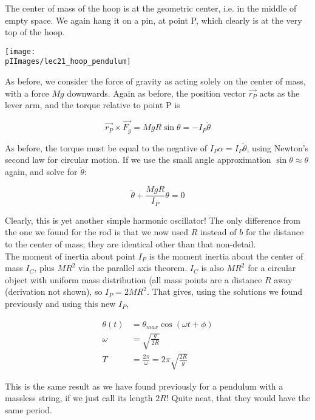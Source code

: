 The center of mass of the hoop is at the geometric center, i.e. in the middle of empty space. We again hang it on a pin, at point P, which clearly is at the very top of the hoop.

\begin{center}
\texttt{[image: \\pIImages/lec21\_hoop\_pendulum]}
\end{center}

As before, we consider the force of gravity as acting solely on the center of mass, with a force $M g$ downwards. Again as before, the position vector $\vec{r_P}$ acts as the lever arm, and the torque relative to point P is

\begin{equation}
\vec{r_P} \times \vec{F_g} = M g R \sin \theta = -I_P \ddot{\theta}
\end{equation}

As before, the torque must be equal to the negative of $I_P \alpha = I_P \ddot{\theta}$, using Newton's second law for circular motion. If we use the small angle approximation $\sin \theta \approx \theta$ again, and solve for $\ddot{\theta}$:

\begin{equation}
\ddot{\theta} + \frac{M g R}{I_P} \theta = 0
\end{equation}

Clearly, this is yet another simple harmonic oscillator! The only difference from the one we found for the rod is that we now used $R$ instead of $b$ for the distance to the center of mass; they are identical other than that non-detail.\\
The moment of inertia about point $I_P$ is the moment inertia about the center of mass $I_C$, plus $M R^2$ via the parallel axis theorem. $I_C$ is also $M R^2$ for a circular object with uniform mass distribution (all mass points are a distance $R$ away (derivation not shown), so $I_P = 2 M R^2$. That gives, using the solutions we found previously and using this new $I_P$,

\begin{align}
\theta(t) &= \theta_{max} \cos(\omega t + \phi)\\
\omega    &= \sqrt{\frac{g}{2 R}}\\
T         &= \frac{2 \pi}{\omega} = 2 \pi \sqrt{\frac{2 R}{g}}
\end{align}

This is the same result as we have found previously for a pendulum with a massless string, if we just call its length $2 R$! Quite neat, that they would have the same period.	

